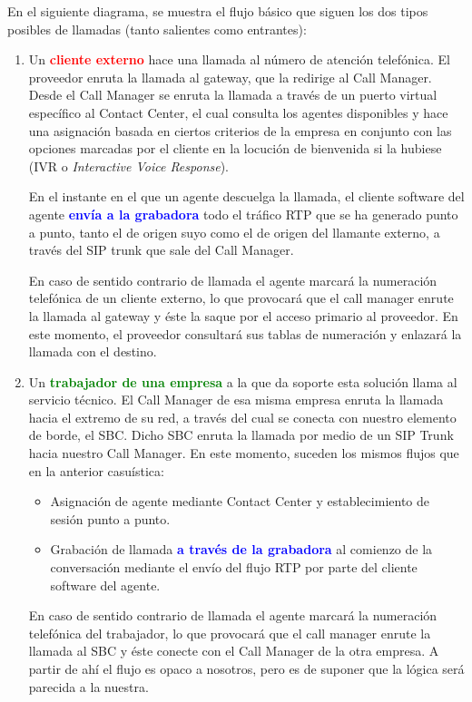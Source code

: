 \documentclass[a4paper, 12pt]{book}
\begin{document}
En el siguiente diagrama, se muestra el flujo básico que siguen los dos tipos posibles de llamadas (tanto salientes como entrantes):
\begin{enumerate}
  \item Un \textbf{\textcolor{red}{cliente externo}} hace una llamada al número de atención telefónica. El proveedor enruta la llamada al gateway, que la redirige al Call Manager. Desde el Call Manager se enruta la llamada a través de un puerto virtual específico al Contact Center, el cual consulta los agentes disponibles y hace una asignación basada en ciertos criterios de la empresa en conjunto con las opciones marcadas por el cliente en la locución de bienvenida si la hubiese (IVR o \emph{Interactive Voice Response}).
  
  En el instante en el que un agente descuelga la llamada, el cliente software del agente \textbf{\textcolor{blue}{envía a la grabadora}} todo el tráfico RTP que se ha generado punto a punto, tanto el de origen suyo como el de origen del llamante externo, a través del SIP trunk que sale del Call Manager.
  
  En caso de sentido contrario de llamada el agente marcará la numeración telefónica de un cliente externo, lo que provocará que el call manager enrute la llamada al gateway y éste la saque por el acceso primario al proveedor. En este momento, el proveedor consultará sus tablas de numeración y enlazará la llamada con el destino.
  \item Un \textbf{\textcolor{green}{trabajador de una empresa}} a la que da soporte esta solución llama al servicio técnico. El Call Manager de esa misma empresa enruta la llamada hacia el extremo de su red, a través del cual se conecta con nuestro elemento de borde, el SBC. Dicho SBC enruta la llamada por medio de un SIP Trunk hacia nuestro Call Manager. En este momento, suceden los mismos flujos que en la anterior casuística:
  \begin{itemize}
    \item Asignación de agente mediante Contact Center y establecimiento de sesión punto a punto.
    \item Grabación de llamada \textbf{\textcolor{blue}{a través de la grabadora}} al comienzo de la conversación mediante el envío del flujo RTP por parte del cliente software del agente.
  \end{itemize}
  En caso de sentido contrario de llamada el agente marcará la numeración telefónica del trabajador, lo que provocará que el call manager enrute la llamada al SBC y éste conecte con el Call Manager de la otra empresa. A partir de ahí el flujo es opaco a nosotros, pero es de suponer que la lógica será parecida a la nuestra.
\end{enumerate}
\end{document}

